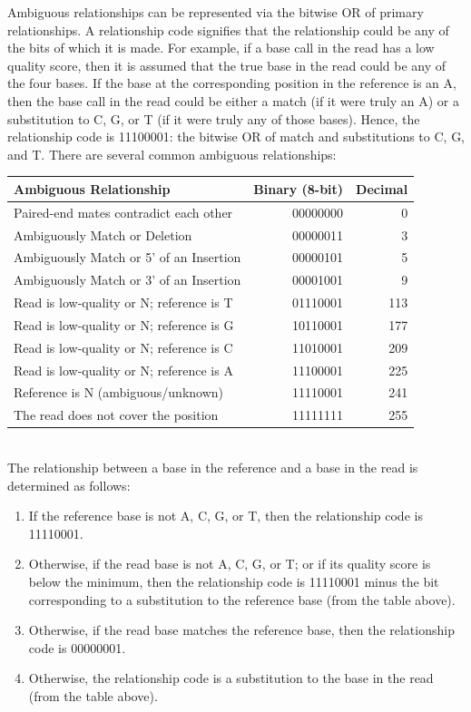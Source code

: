 \documentclass[11pt]{article}
\begin{document}
Ambiguous relationships can be represented via the bitwise OR of primary relationships.
A relationship code signifies that the relationship could be any of the bits of which it is made.
For example, if a base call in the read has a low quality score, then it is assumed that the true base in the read could be any of the four bases.
If the base at the corresponding position in the reference is an A, then the base call in the read could be either a match (if it were truly an A) or a substitution to C, G, or T (if it were truly any of those bases).
Hence, the relationship code is 11100001: the bitwise OR of match and substitutions to C, G, and T.
There are several common ambiguous relationships: \\

\begin{tabular}{ l r r }
\hline
\textbf{Ambiguous Relationship} & \textbf{Binary (8-bit)} & \textbf{Decimal} \\
\hline
Paired-end mates contradict each other & 00000000 & 0 \\
Ambiguously Match or Deletion & 00000011 & 3 \\
Ambiguously Match or 5' of an Insertion & 00000101 & 5 \\
Ambiguously Match or 3' of an Insertion & 00001001 & 9 \\
Read is low-quality or N; reference is T & 01110001 & 113 \\
Read is low-quality or N; reference is G & 10110001 & 177 \\
Read is low-quality or N; reference is C & 11010001 & 209 \\
Read is low-quality or N; reference is A & 11100001 & 225 \\
Reference is N (ambiguous/unknown) & 11110001 & 241 \\
The read does not cover the position & 11111111 & 255 \\
\hline
\end{tabular} \\

The relationship between a base in the reference and a base in the read is determined as follows:
\begin{enumerate}
    \item If the reference base is not A, C, G, or T, then the relationship code is 11110001.
    \item Otherwise, if the read base is not A, C, G, or T; or if its quality score is below the minimum, then the relationship code is 11110001 minus the bit corresponding to a substitution to the reference base (from the table above).
    \item Otherwise, if the read base matches the reference base, then the relationship code is 00000001.
    \item Otherwise, the relationship code is a substitution to the base in the read (from the table above).
\end{enumerate}
\end{document}
